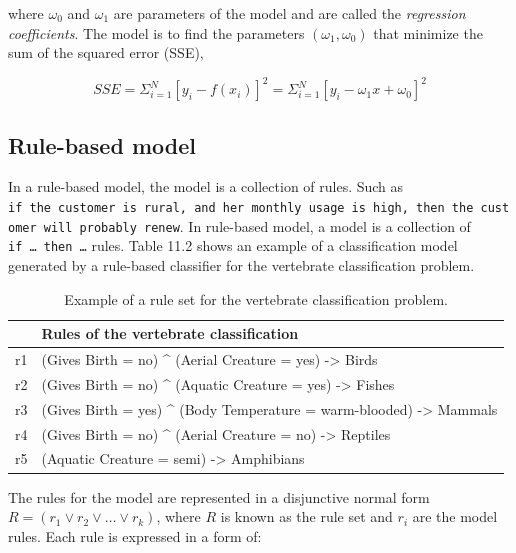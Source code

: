 \documentclass[
]{book}
\begin{document}
where \(ω_0\) and \(ω_1\) are parameters of the model and are called the \emph{regression coefficients}. The model is to find the parameters \((ω_1, ω_0)\) that minimize the sum of the squared error (SSE),

\begin{equation} 
 SSE= \Sigma^{N}_{i=1}[y_i-f(x_i)]^2 = \Sigma^{N}_{i=1}[y_i - ω_1 x + ω_0 ]^2
  \label{eq:sse}
\end{equation}

\hypertarget{rule-based-model}{%
\subsection{Rule-based model}\label{rule-based-model}}

In a rule-based model, the model is a collection of rules. Such as \texttt{if\ the\ customer\ is\ rural,\ and\ her\ monthly\ usage\ is\ high,\ then\ the\ customer\ will\ probably\ renew}.
In rule-based model, a model is a collection of \texttt{if\ \ldots{}\ then\ \ldots{}} rules. Table 11.2 shows an example of a classification model generated by a rule-based classifier for the vertebrate classification problem.

\begin{table}

\caption{\label{tab:unnamed-chunk-44}Example of a rule set for the vertebrate classification problem.}
\centering
\begin{tabular}[t]{ll}
\toprule
  & Rules of the vertebrate classification\\
\midrule
r1 & (Gives Birth = no) \textasciicircum{} (Aerial Creature = yes) -> Birds\\
r2 & (Gives Birth = no) \textasciicircum{} (Aquatic Creature = yes) -> Fishes\\
r3 & (Gives Birth = yes) \textasciicircum{} (Body Temperature = warm-blooded) -> Mammals\\
r4 & (Gives Birth = no) \textasciicircum{} (Aerial Creature = no) -> Reptiles\\
r5 & (Aquatic Creature = semi) -> Amphibians\\
\bottomrule
\end{tabular}
\end{table}

The rules for the model are represented in a disjunctive normal form \(R=(r_1 \vee r_2\vee … \vee r_k)\), where \(R\) is known as the rule set and \(r_i\) are the model rules.
Each rule is expressed in a form of:
\end{document}
